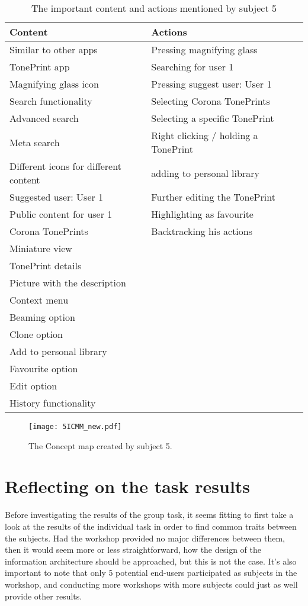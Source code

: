 \begin{table}[H]
\begin{minipage}[b]{\linewidth}\centering
	\begin{tabular} {|l|l|l|} \hline
		\rowcolor{xGray25} \textbf{Content} & \textbf{Actions} \\  \hline
		Similar to other apps & Pressing magnifying glass \\
		TonePrint app & Searching for user 1 \\
		Magnifying glass icon & Pressing suggest user: User 1 \\
		Search functionality & Selecting Corona TonePrints \\
		Advanced search & Selecting a specific TonePrint \\
		Meta search & Right clicking / holding a TonePrint \\
		Different icons for different content & adding to personal library \\
		Suggested user: User 1 & Further editing the TonePrint \\
		Public content for user 1 & Highlighting as favourite \\
		Corona TonePrints & Backtracking his actions \\
		Miniature view &  \\
		TonePrint details & \\
		Picture with the description & \\
		Context menu & \\
		Beaming option & \\
		Clone option & \\
		Add to personal library & \\
		Favourite option & \\
		Edit option & \\
		History functionality & \\ \hline
	\end{tabular}
	\caption{The important content and actions mentioned by subject 5}
	\label{tab:Subject5ContentActions}
\end{minipage}
\end{table}
%
\begin{figure}[H]
	\centering
	\texttt{[image: 5ICMM\_new.pdf]}
	\caption{The Concept map created by subject 5.}
	\label{fig:ICMM5}
\end{figure}



\section{Reflecting on the task results}
\label{IndividualTaskReflection}
Before investigating the results of the group task, it seems fitting to first take a look at the results of the individual task in order to find common traits between the subjects. Had the workshop provided no major differences between them, then it would seem more or less straightforward, how the design of the information architecture should be approached, but this is not the case. It's also important to note that only 5 potential end-users participated as subjects in the workshop, and conducting more workshops with more subjects could just as well provide other results.

